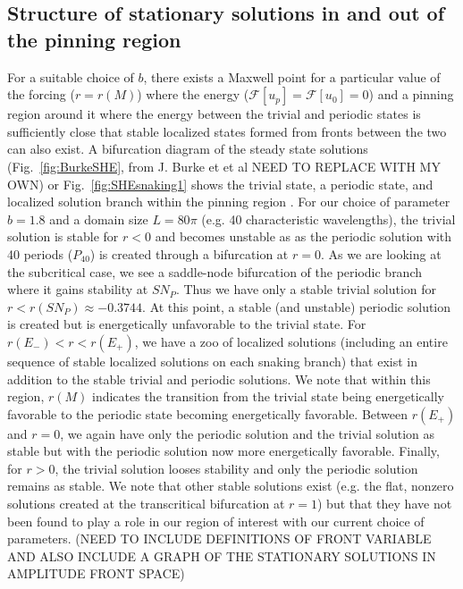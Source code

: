\documentclass[../main/TimeForcingSHE.tex]{subfiles}
\begin{document}
\subsection{Structure of stationary solutions in and out of the pinning region}
For a suitable choice of $b$, there exists a Maxwell point for a particular value of the forcing ($r=r(M)$) where the energy ($\mathcal{F}[u_p]=\mathcal{F}[u_0]=0$) and a pinning region around it where the energy between the trivial and periodic states is sufficiently close that stable localized states formed from fronts between the two can also exist.  A bifurcation diagram of the steady state solutions (Fig.~\ref{fig:BurkeSHE}, from J. Burke et et al NEED TO REPLACE WITH MY OWN) or Fig.~\ref{fig:SHEsnaking1} shows the trivial state, a periodic state, and localized solution branch within the pinning region .  
\FIGshesnaking
For our choice of parameter $b=1.8$ and a domain size $L=80\pi$ (e.g. 40 characteristic wavelengths), the trivial solution is stable for $r<0$ and becomes unstable as as the periodic solution with 40 periods ($P_{40}$) is created through a bifurcation at $r=0$.  As we are looking at the subcritical case, we see a saddle-node bifurcation of the periodic branch where it gains stability at $SN_{P}$.  Thus we have only a stable trivial solution for $r<r(SN_{P})\approx -0.3744$. At this point, a stable (and unstable) periodic solution is created but is energetically unfavorable to the trivial state.  For $r(E_-)<r<r(E_+)$, we have a zoo of localized solutions (including an entire sequence of stable localized solutions on each snaking branch) that exist in addition to the stable trivial and periodic solutions.  We note that within this region, $r(M)$ indicates the transition from the trivial state being energetically favorable to the periodic state becoming energetically favorable.  Between $r(E_+)$ and $r=0$, we again have only the periodic solution and the trivial solution as stable  but with the periodic solution now more energetically favorable.   Finally, for $r>0$, the trivial solution looses stability and only the periodic solution remains as stable.  We note that other stable solutions exist (e.g. the flat, nonzero solutions created at the transcritical bifurcation at $r=1$) but that they have not been found to play a role in our region of interest with our current choice of parameters. 
\FIGshesnakingONE
(NEED TO INCLUDE DEFINITIONS OF FRONT VARIABLE AND ALSO INCLUDE A GRAPH OF THE STATIONARY SOLUTIONS IN AMPLITUDE FRONT SPACE)
\end{document}
